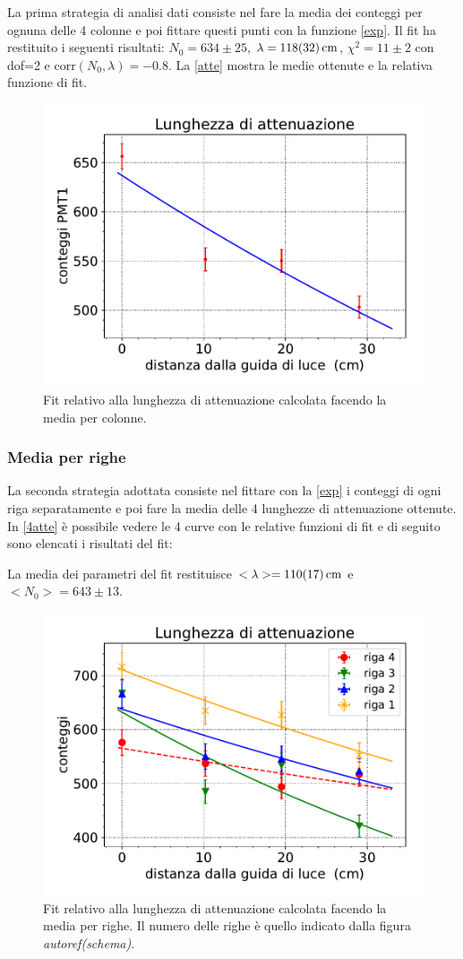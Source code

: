 La prima strategia di analisi dati consiste nel fare la media dei conteggi per ognuna delle 4 colonne e poi fittare questi punti con la funzione \eqref{exp}.  
Il fit ha restituito i seguenti risultati: $N_0=634\pm25$,  $\lambda=\SI{118\pm32}{cm}$, $\chi^2=11\pm2$ con dof=2 e corr$(N_0,\lambda)=-0.8$.  
La \autoref{atte} mostra le medie ottenute e la relativa funzione di fit.
\begin{figure}[h]
\centering
\includegraphics[width=8 cm]{atte}
\caption{Fit relativo alla lunghezza di attenuazione calcolata facendo la media per colonne.}
\label{atte}
\end{figure}

\subsubsection{Media per righe}

La seconda strategia adottata consiste nel fittare con la \eqref{exp} i conteggi di ogni riga separatamente e poi fare la media delle 4 lunghezze di attenuazione ottenute.
In \autoref{4atte} è possibile vedere le 4 curve con le relative funzioni di fit e di seguito sono elencati i risultati del fit:  

La media dei parametri del fit restituisce $<\lambda>=\SI{110\pm17}{cm}$ e $<N_0>=643\pm13$.
\begin{figure}[h]
\centering
\includegraphics[width=8 cm]{4atte}
\caption{Fit relativo alla lunghezza di attenuazione calcolata facendo la media per righe. Il numero delle righe è quello indicato dalla figura \emph{autoref(schema)}.}
\label{4atte}
\end{figure}


